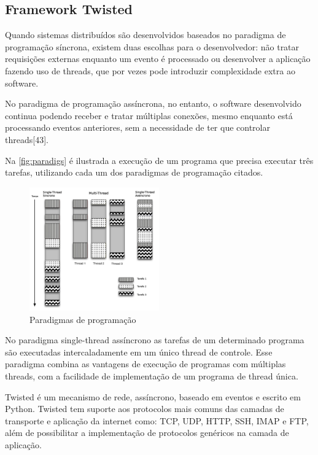 \documentclass[journal]{IEEEtran}
\begin{document}
\subsection{Framework Twisted}

Quando sistemas distribuídos são desenvolvidos baseados no paradigma de programação síncrona, existem duas escolhas para o desenvolvedor: não tratar requisições externas enquanto um evento é processado ou desenvolver a aplicação fazendo uso de threads, que por vezes pode introduzir complexidade extra ao software.

No paradigma de programação assíncrona, no entanto, o software desenvolvido continua podendo receber e tratar múltiplas conexões, mesmo enquanto está processando eventos anteriores, sem a necessidade de ter que controlar threads[43].

Na \autoref{fig:paradigs} é ilustrada a execução de um programa que precisa executar três tarefas, utilizando cada um dos paradigmas de programação citados.

\begin{figure}[htb]
    \begin{center}
        \includegraphics[width=2.2in]{Figuras/paradigmas.png}
        \caption{\label{fig:paradigs}Paradigmas de programação}
    \end{center}
\end{figure}

No paradigma single-thread assíncrono as tarefas de um determinado programa são executadas intercaladamente em um único thread de controle. Esse paradigma combina as vantagens de execução de programas com múltiplas threads, com a facilidade de implementação de um programa de thread única.

Twisted é um mecanismo de rede, assíncrono, baseado em eventos e escrito em Python. Twisted tem suporte aos protocolos mais comuns das camadas de transporte e aplicação da internet como: TCP, UDP, HTTP, SSH, IMAP e FTP, além de possibilitar a implementação de protocolos genéricos na camada de aplicação. 
\end{document}
